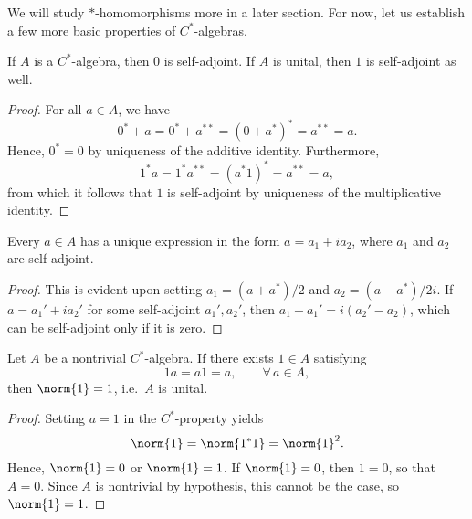 We will study $*$-homomorphisms more in a later section. For now, let us establish a few more basic properties of $C^*$-algebras.


\begin{proposition}
If $A$ is a $C^*$-algebra, then $0$ is self-adjoint. If $A$ is unital, then $1$ is self-adjoint as well.
\end{proposition}

\begin{proof}
For all $a \in A$, we have
\begin{equation}
0^* + a = 0^* + a^{**} = (0 + a^*)^* = a^{**} = a.
\end{equation}
Hence, $0^* = 0$ by uniqueness of the additive identity. Furthermore,
\begin{equation}
1^*a = 1^*a^{**} = (a^*1)^* = a^{**} = a,
\end{equation}
from which it follows that $1$ is self-adjoint by uniqueness of the multiplicative identity.
\end{proof}

\begin{proposition}
Every $a \in A$ has a unique expression in the form $a = a_1 + ia_2$, where $a_1$ and $a_2$ are self-adjoint.
\end{proposition}

\begin{proof}
This is evident upon setting $a_1 = (a + a^*)/2$ and $a_2 = (a - a^*)/2i$. If $a = a_1' + ia_2'$ for some self-adjoint $a_1', a_2'$, then $a_1 - a_1' = i(a_2' - a_2)$, which can be self-adjoint only if it is zero.
\end{proof}

\begin{proposition}
Let $A$ be a nontrivial $C^*$-algebra. If there exists $1 \in A$ satisfying
\begin{equation}
1a = a1 = a, \qquad \forall \, a \in A, 
\end{equation}
then $\norm{1} = 1$, i.e.\ $A$ is unital.
\end{proposition}

\begin{proof}
Setting $a = 1$ in the $C^*$-property yields
\begin{equation}
\norm{1} = \norm{1^*1} = \norm{1}^2.
\end{equation}
Hence, $\norm{1} = 0$ or $\norm{1} = 1$. If $\norm{1} = 0$, then $1 = 0$, so that $A = \qty{0}$. Since $A$ is nontrivial by hypothesis, this cannot be the case, so $\norm{1} = 1$.
\end{proof}


